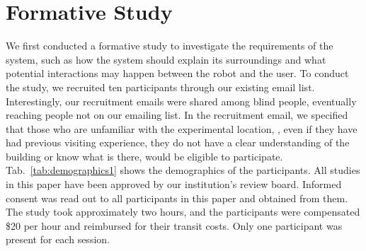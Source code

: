 \vspace{-2mm}
\section{Formative Study}
\label{sec:study1}
We first conducted a formative study to investigate the requirements of the system, such as how the system should explain its surroundings and what potential interactions may happen between the robot and the user.
To conduct the study, we recruited ten participants through our existing email list.
Interestingly, our recruitment emails were shared among blind people, eventually reaching people not on our emailing list. 
In the recruitment email, we specified that those who are unfamiliar with the experimental location, \ie, even if they have had previous visiting experience, they do not have a clear understanding of the building or know what is there, would be eligible to participate.
Tab.~\ref{tab:demographics1} shows the demographics of the participants. 
All studies in this paper have been approved by our institution's review board.
Informed consent was read out to all participants in this paper and obtained from them. 
The study took approximately two hours, and the participants were compensated \$20 per hour and reimbursed for their transit costs.
Only one participant was present for each session. 


